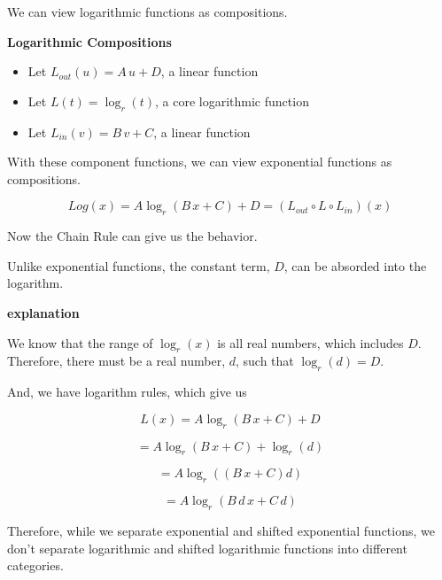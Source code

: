 \documentclass{ximera}
\begin{document}
\begin{formuala}
We can view logarithmic functions as compositions.



\begin{idea}  \textbf{\textcolor{blue!55!black}{Logarithmic Compositions}} 




\begin{itemize}
\item Let $L_{out}(u) = A \, u + D$, a linear function
\item Let $L(t) = \log_r(t)$, a core logarithmic function
\item Let $L_{in}(v) = B \, v + C$, a linear function
\end{itemize}

With these component functions, we can view exponential functions as compositions.


\[  Log(x) = A \log_r(B \, x + C) + D = (L_{out} \circ L \circ L_{in})(x) \]


Now the Chain Rule can give us the behavior.

\end{idea}








\begin{fact}


Unlike exponential functions, the constant term, $D$, can be absorded into the logarithm.




\textbf{\textcolor{red!75!green}{explanation}} 

We know that the range of $\log_r(x)$ is all real numbers, which includes $D$.  Therefore, there must be a real number, $d$, such that $\log_r(d) = D$. 


And, we have logarithm rules, which give us



\[
L(x) = A \log_r(B \, x + C) + D 
\]




\[
= A \log_r(B \, x + C) + \log_r(d)
\]



\[
= A \log_r((B \, x + C)d) 
\]





\[
= A \log_r(B \, d \, x + C \, d) 
\]





Therefore, while we separate exponential and shifted exponential functions, we don't separate logarithmic and shifted logarithmic functions into different categories.


\end{fact}
\end{formuala}
\end{document}
